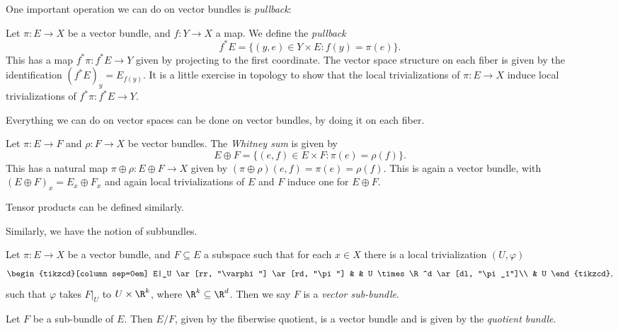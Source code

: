 \documentclass[a4paper]{article}
\theoremstyle{definition}
\begin{document}
One important operation we can do on vector bundles is \emph{pullback}:
\begin{defi}
  Let $\pi: E \to X$ be a vector bundle, and $f: Y \to X$ a map. We define the \emph{pullback}
  \[
    f^* E = \{(y, e) \in Y \times E: f(y) = \pi(e)\}.
  \]
  This has a map $f^*\pi: f^*E \to Y$ given by projecting to the first coordinate. The vector space structure on each fiber is given by the identification $(f^*E)_y = E_{f(y)}$. It is a little exercise in topology to show that the local trivializations of $\pi: E \to X$ induce local trivializations of $f^*\pi: f^* E \to Y$.
\end{defi}

Everything we can do on vector spaces can be done on vector bundles, by doing it on each fiber.
\begin{defi}
  Let $\pi: E \to F$ and $\rho: F \to X$ be vector bundles. The \emph{Whitney sum} is given by
  \[
    E \oplus F = \{(e, f)\in E \times F: \pi(e) = \rho(f)\}.
  \]
  This has a natural map $\pi \oplus \rho: E \oplus F \to X$ given by $(\pi \oplus \rho)(e, f) = \pi(e) = \rho(f)$. This is again a vector bundle, with $(E \oplus F)_x = E_x \oplus F_x$ and again local trivializations of $E$ and $F$ induce one for $E \oplus F$.
\end{defi}
Tensor products can be defined similarly.

Similarly, we have the notion of subbundles.
\begin{defi}
  Let $\pi: E \to X$ be a vector bundle, and $F \subseteq E$ a subspace such that for each $x \in X$ there is a local trivialization $(U, \varphi)$
  \[
    \begin{tikzcd}[column sep=0em]
      E|_U \ar[rr, "\varphi"] \ar[rd, "\pi"] & & U \times \R^d \ar[dl, "\pi_1"]\\
      & U
    \end{tikzcd},
  \]
  such that $\varphi$ takes $F|_U$ to $U \times \R^k$, where $\R^k \subseteq \R^d$. Then we say $F$ is a \emph{vector sub-bundle}.
\end{defi}

\begin{defi}
  Let $F$ be a sub-bundle of $E$. Then $E/F$, given by the fiberwise quotient, is a vector bundle and is given by the \emph{quotient bundle}.
\end{defi}
\end{document}
